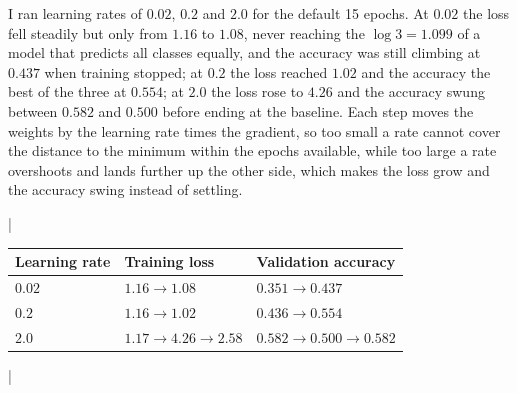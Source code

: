 \begin{answer}
  I ran learning rates of $0.02$, $0.2$ and $2.0$ for the default 15 epochs. At $0.02$ the loss
  fell steadily but only from $1.16$ to $1.08$, never reaching the $\log 3 = 1.099$ of a model that
  predicts all classes equally, and the accuracy was still climbing at $0.437$ when training
  stopped; at $0.2$ the loss reached $1.02$ and the accuracy the best of the three at $0.554$;
  at $2.0$ the loss rose to $4.26$ and the accuracy swung between $0.582$ and $0.500$ before
  ending at the baseline. Each step moves the weights by the learning rate times the
  gradient, so too small a rate cannot cover the distance to the minimum within the epochs
  available, while too large a rate overshoots and lands further up the other side, which makes the
  loss grow and the accuracy swing instead of settling.

  \medskip
  \begin{table}[H]
  \centering
  \lstDeleteShortInline|
  \begin{tabular}{|l|l|l|}
  \hline
  Learning rate & Training loss & Validation accuracy \\
  \hline
  $0.02$ & $1.16 \rightarrow 1.08$ & $0.351 \rightarrow 0.437$ \\
  \hline
  $0.2$ & $1.16 \rightarrow 1.02$ & $0.436 \rightarrow 0.554$ \\
  \hline
  $2.0$ & $1.17 \rightarrow 4.26 \rightarrow 2.58$ & $0.582 \rightarrow 0.500 \rightarrow 0.582$ \\
  \hline
  \end{tabular}
  \lstMakeShortInline|
  \end{table}
\end{answer}
\clearpage

